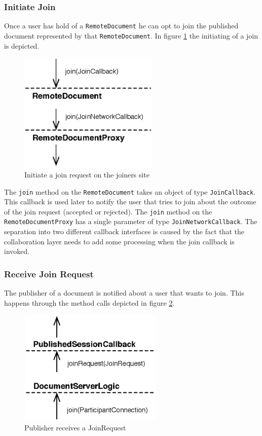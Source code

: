 \subsubsection{Initiate Join}
\label{sect:archoverview.flow.initiatejoin}
Once a user has hold of a \texttt{Remote\-Document} he can opt to join the
published document represented by that \texttt{Remote\-Document}. In figure
\ref{fig:archoverview.flow.joininitiate} the initiating of a join
is depicted.

\begin{figure}[H]
 \centering
 \includegraphics[width=6.67cm,height=5.72cm]{../images/finalreport/architecture_flows/join_initiate.eps}
 \caption{Initiate a join request on the joiners site}
 \label{fig:archoverview.flow.joininitiate}
\end{figure}

The \texttt{join} method on the \texttt{Remote\-Document} takes an object of
type \texttt{Join\-Callback}. This callback is used later to notify the
user that tries to join about the outcome of the join request (accepted or
rejected). The \texttt{join} method on the \texttt{Remote\-Document\-Proxy} has
a single parameter of type \texttt{Join\-Network\-Callback}. The separation
into two different callback interfaces is caused by the fact that the
collaboration layer needs to add some processing when the join callback
is invoked.

\subsubsection{Receive Join Request}
The publisher of a document is notified about a user that wants to join. 
This happens through the method calls depicted in figure 
\ref{fig:archoverview.flow.joinrequest}.

\begin{figure}[H]
 \centering
 \includegraphics[width=6.88cm,height=5.50cm]{../images/finalreport/architecture_flows/join_request.eps}
 \caption{Publisher receives a JoinRequest}
 \label{fig:archoverview.flow.joinrequest}
\end{figure}

